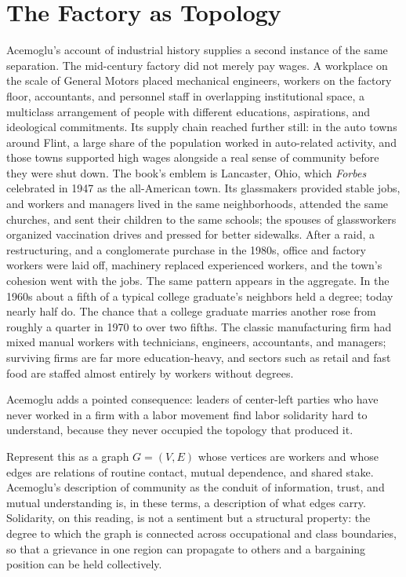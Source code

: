 \documentclass[11pt]{article}
\begin{document}
\section{The Factory as Topology}\label{sec:factory}

Acemoglu's account of industrial history supplies a second instance of the same separation. The mid-century factory did not merely pay wages. A workplace on the scale of General Motors placed mechanical engineers, workers on the factory floor, accountants, and personnel staff in overlapping institutional space, a multiclass arrangement of people with different educations, aspirations, and ideological commitments. Its supply chain reached further still: in the auto towns around Flint, a large share of the population worked in auto-related activity, and those towns supported high wages alongside a real sense of community before they were shut down. The book's emblem is Lancaster, Ohio, which \emph{Forbes} celebrated in 1947 as the all-American town. Its glassmakers provided stable jobs, and workers and managers lived in the same neighborhoods, attended the same churches, and sent their children to the same schools; the spouses of glassworkers organized vaccination drives and pressed for better sidewalks. After a raid, a restructuring, and a conglomerate purchase in the 1980s, office and factory workers were laid off, machinery replaced experienced workers, and the town's cohesion went with the jobs. The same pattern appears in the aggregate. In the 1960s about a fifth of a typical college graduate's neighbors held a degree; today nearly half do. The chance that a college graduate marries another rose from roughly a quarter in 1970 to over two fifths. The classic manufacturing firm had mixed manual workers with technicians, engineers, accountants, and managers; surviving firms are far more education-heavy, and sectors such as retail and fast food are staffed almost entirely by workers without degrees.

Acemoglu adds a pointed consequence: leaders of center-left parties who have never worked in a firm with a labor movement find labor solidarity hard to understand, because they never occupied the topology that produced it.

Represent this as a graph $G = (V, E)$ whose vertices are workers and whose edges are relations of routine contact, mutual dependence, and shared stake. Acemoglu's description of community as the conduit of information, trust, and mutual understanding is, in these terms, a description of what edges carry. Solidarity, on this reading, is not a sentiment but a structural property: the degree to which the graph is connected across occupational and class boundaries, so that a grievance in one region can propagate to others and a bargaining position can be held collectively.
\end{document}
